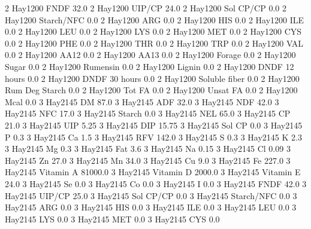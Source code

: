 \documentclass[letterpaper,10pt,english]{sphinxmanual}
\begin{document}
\begin{sphinxVerbatim}[commandchars=\\\{\},numbers=left,firstnumber=1,stepnumber=1]
2 Hay\PYGZsh{}1\PYGZhy{}200 FNDF 32.0
2 Hay\PYGZsh{}1\PYGZhy{}200 UIP/CP 24.0
2 Hay\PYGZsh{}1\PYGZhy{}200 Sol CP/CP 0.0
2 Hay\PYGZsh{}1\PYGZhy{}200 Starch/NFC 0.0
2 Hay\PYGZsh{}1\PYGZhy{}200 ARG 0.0
2 Hay\PYGZsh{}1\PYGZhy{}200 HIS 0.0
2 Hay\PYGZsh{}1\PYGZhy{}200 ILE 0.0
2 Hay\PYGZsh{}1\PYGZhy{}200 LEU 0.0
2 Hay\PYGZsh{}1\PYGZhy{}200 LYS 0.0
2 Hay\PYGZsh{}1\PYGZhy{}200 MET 0.0
2 Hay\PYGZsh{}1\PYGZhy{}200 CYS 0.0
2 Hay\PYGZsh{}1\PYGZhy{}200 PHE 0.0
2 Hay\PYGZsh{}1\PYGZhy{}200 THR 0.0
2 Hay\PYGZsh{}1\PYGZhy{}200 TRP 0.0
2 Hay\PYGZsh{}1\PYGZhy{}200 VAL 0.0
2 Hay\PYGZsh{}1\PYGZhy{}200 AA\PYGZsh{}12 0.0
2 Hay\PYGZsh{}1\PYGZhy{}200 AA\PYGZsh{}13 0.0
2 Hay\PYGZsh{}1\PYGZhy{}200 \PYGZpc{} Forage 0.0
2 Hay\PYGZsh{}1\PYGZhy{}200 Sugar \PYGZpc{} 0.0
2 Hay\PYGZsh{}1\PYGZhy{}200 Rumensin 0.0
2 Hay\PYGZsh{}1\PYGZhy{}200 Lignin 0.0
2 Hay\PYGZsh{}1\PYGZhy{}200 DNDF 12 hours 0.0
2 Hay\PYGZsh{}1\PYGZhy{}200 DNDF 30 hours 0.0
2 Hay\PYGZsh{}1\PYGZhy{}200 Soluble fiber 0.0
2 Hay\PYGZsh{}1\PYGZhy{}200 Rum Deg Starch 0.0
2 Hay\PYGZsh{}1\PYGZhy{}200 Tot FA 0.0
2 Hay\PYGZsh{}1\PYGZhy{}200 Unsat FA 0.0
2 Hay\PYGZsh{}1\PYGZhy{}200 Mcal 0.0
3 Hay\PYGZsh{}2\PYGZhy{}145 DM 87.0
3 Hay\PYGZsh{}2\PYGZhy{}145 ADF 32.0
3 Hay\PYGZsh{}2\PYGZhy{}145 NDF 42.0
3 Hay\PYGZsh{}2\PYGZhy{}145 NFC 17.0
3 Hay\PYGZsh{}2\PYGZhy{}145 Starch 0.0
3 Hay\PYGZsh{}2\PYGZhy{}145 NEL 65.0
3 Hay\PYGZsh{}2\PYGZhy{}145 CP 21.0
3 Hay\PYGZsh{}2\PYGZhy{}145 UIP 5.25
3 Hay\PYGZsh{}2\PYGZhy{}145 DIP 15.75
3 Hay\PYGZsh{}2\PYGZhy{}145 Sol CP 0.0
3 Hay\PYGZsh{}2\PYGZhy{}145 P 0.3
3 Hay\PYGZsh{}2\PYGZhy{}145 Ca 1.5
3 Hay\PYGZsh{}2\PYGZhy{}145 RFV 142.0
3 Hay\PYGZsh{}2\PYGZhy{}145 S 0.3
3 Hay\PYGZsh{}2\PYGZhy{}145 K 2.3
3 Hay\PYGZsh{}2\PYGZhy{}145 Mg 0.3
3 Hay\PYGZsh{}2\PYGZhy{}145 Fat 3.6
3 Hay\PYGZsh{}2\PYGZhy{}145 Na 0.15
3 Hay\PYGZsh{}2\PYGZhy{}145 Cl 0.09
3 Hay\PYGZsh{}2\PYGZhy{}145 Zn 27.0
3 Hay\PYGZsh{}2\PYGZhy{}145 Mn 34.0
3 Hay\PYGZsh{}2\PYGZhy{}145 Cu 9.0
3 Hay\PYGZsh{}2\PYGZhy{}145 Fe 227.0
3 Hay\PYGZsh{}2\PYGZhy{}145 Vitamin A 81000.0
3 Hay\PYGZsh{}2\PYGZhy{}145 Vitamin D 2000.0
3 Hay\PYGZsh{}2\PYGZhy{}145 Vitamin E 24.0
3 Hay\PYGZsh{}2\PYGZhy{}145 Se 0.0
3 Hay\PYGZsh{}2\PYGZhy{}145 Co 0.0
3 Hay\PYGZsh{}2\PYGZhy{}145 I 0.0
3 Hay\PYGZsh{}2\PYGZhy{}145 FNDF 42.0
3 Hay\PYGZsh{}2\PYGZhy{}145 UIP/CP 25.0
3 Hay\PYGZsh{}2\PYGZhy{}145 Sol CP/CP 0.0
3 Hay\PYGZsh{}2\PYGZhy{}145 Starch/NFC 0.0
3 Hay\PYGZsh{}2\PYGZhy{}145 ARG 0.0
3 Hay\PYGZsh{}2\PYGZhy{}145 HIS 0.0
3 Hay\PYGZsh{}2\PYGZhy{}145 ILE 0.0
3 Hay\PYGZsh{}2\PYGZhy{}145 LEU 0.0
3 Hay\PYGZsh{}2\PYGZhy{}145 LYS 0.0
3 Hay\PYGZsh{}2\PYGZhy{}145 MET 0.0
3 Hay\PYGZsh{}2\PYGZhy{}145 CYS 0.0

\end{sphinxVerbatim}
\end{document}
